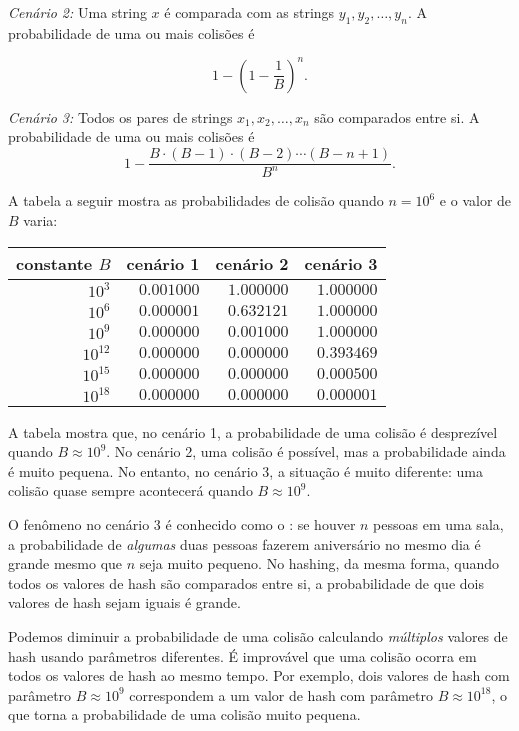 \textit{Cenário 2:} Uma string $x$ é comparada com as strings $y_1,y_2,\ldots,y_n$. A probabilidade de uma ou mais colisões é

\[1-(1-\frac{1}{B})^n.\]

\textit{Cenário 3:} Todos os pares de strings $x_1,x_2,\ldots,x_n$ são comparados entre si. A probabilidade de uma ou mais colisões é
\[ 1 - \frac{B \cdot (B-1) \cdot (B-2) \cdots (B-n+1)}{B^n}.\]

A tabela a seguir mostra as probabilidades de colisão quando $n=10^6$ e o valor de $B$ varia:

\begin{center}
\begin{tabular}{rrrr}
constante $B$ & cenário 1 & cenário 2 & cenário 3 \\
\hline
$10^3$ & $0.001000$ & $1.000000$ & $1.000000$ \\
$10^6$ & $0.000001$ & $0.632121$ & $1.000000$ \\
$10^9$ & $0.000000$ & $0.001000$ & $1.000000$ \\
$10^{12}$ & $0.000000$ & $0.000000$ & $0.393469$ \\
$10^{15}$ & $0.000000$ & $0.000000$ & $0.000500$ \\
$10^{18}$ & $0.000000$ & $0.000000$ & $0.000001$ \\
\end{tabular}
\end{center}

A tabela mostra que, no cenário 1, a probabilidade de uma colisão é desprezível quando $B \approx 10^9$. No cenário 2, uma colisão é possível, mas a probabilidade ainda é muito pequena. No entanto, no cenário 3, a situação é muito diferente: uma colisão quase sempre acontecerá quando $B \approx 10^9$.


O fenômeno no cenário 3 é conhecido como o : se houver $n$ pessoas em uma sala, a probabilidade de \emph{algumas} duas pessoas fazerem aniversário no mesmo dia é grande mesmo que $n$ seja muito pequeno. No hashing, da mesma forma, quando todos os valores de hash são comparados entre si, a probabilidade de que dois valores de hash sejam iguais é grande.

Podemos diminuir a probabilidade de uma colisão calculando \emph{múltiplos} valores de hash usando parâmetros diferentes. É improvável que uma colisão ocorra em todos os valores de hash ao mesmo tempo. Por exemplo, dois valores de hash com parâmetro $B \approx 10^9$ correspondem a um valor de hash com parâmetro $B \approx 10^{18}$, o que torna a probabilidade de uma colisão muito pequena.

